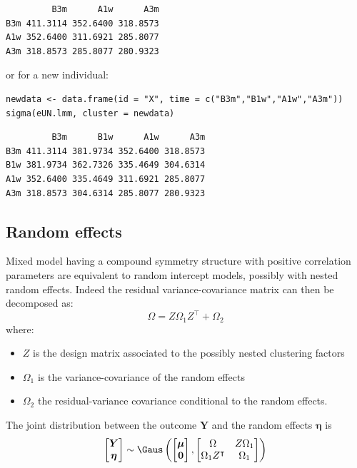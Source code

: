 \documentclass[12pt]{article}
\newcommand\trans[1]{{#1}^\intercal}%
\newcommand\Veta{\boldsymbol{\eta}}
\newcommand{\VY}{\boldsymbol{Y}}
\begin{document}
\begin{verbatim}
         B3m      A1w      A3m
B3m 411.3114 352.6400 318.8573
A1w 352.6400 311.6921 285.8077
A3m 318.8573 285.8077 280.9323
\end{verbatim}


or for a new individual:
\lstset{language=r,label= ,caption= ,captionpos=b,numbers=none}
\begin{lstlisting}
newdata <- data.frame(id = "X", time = c("B3m","B1w","A1w","A3m"))
sigma(eUN.lmm, cluster = newdata)
\end{lstlisting}

\begin{verbatim}
         B3m      B1w      A1w      A3m
B3m 411.3114 381.9734 352.6400 318.8573
B1w 381.9734 362.7326 335.4649 304.6314
A1w 352.6400 335.4649 311.6921 285.8077
A3m 318.8573 304.6314 285.8077 280.9323
\end{verbatim}

\subsection{Random effects}
\label{sec:orgdff0460}

Mixed model having a compound symmetry structure with positive
correlation parameters are equivalent to random intercept models,
possibly with nested random effects. Indeed the residual
variance-covariance matrix can then be decomposed as:
\[ \Omega = Z \Omega_1 \trans{Z} + \Omega_2 \]
where:
\begin{itemize}
\item \(Z\) is the design matrix associated to the possibly nested clustering factors
\item \(\Omega_1\) is the variance-covariance of the random effects
\item \(\Omega_2\) the residual-variance covariance conditional to the random effects.
\end{itemize}
The joint distribution between the outcome \(\VY\) and the random
effects \(\Veta\) is
\[
\begin{bmatrix} \VY \\ \Veta \end{bmatrix} \sim \Gaus\left(\begin{bmatrix} \boldsymbol{\mu} \\ \mathbf{0} \end{bmatrix}, \begin{bmatrix} \Omega & Z \Omega_1 \\ \Omega_1 \trans{Z} & \Omega_1 \end{bmatrix}\right)
\]
\end{document}
